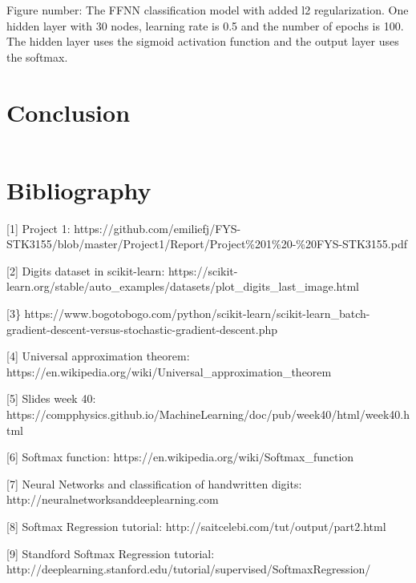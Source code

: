 \documentclass[11pt]{article}
\makeatletter
\newcommand{\boxspacing}{\kern\kvtcb@left@rule\kern\kvtcb@boxsep}
\newcommand{\prompt}[4]{
        {\ttfamily\llap{{\color{#2}[#3]:\hspace{3pt}#4}}\vspace{-\baselineskip}}
    }
\makeatother
\begin{document}
    Figure number: The FFNN classification model with added l2
regularization. One hidden layer with 30 nodes, learning rate is 0.5 and
the number of epochs is 100. The hidden layer uses the sigmoid
activation function and the output layer uses the softmax.

    \hypertarget{conclusion}{%
\section{Conclusion}\label{conclusion}}

    \begin{tcolorbox}[breakable, size=fbox, boxrule=1pt, pad at break*=1mm,colback=cellbackground, colframe=cellborder]
\prompt{In}{incolor}{ }{\boxspacing}
\begin{Verbatim}[commandchars=\\\{\}]

\end{Verbatim}
\end{tcolorbox}

    \hypertarget{bibliography}{%
\section{Bibliography}\label{bibliography}}

{[}1{]} Project 1:
https://github.com/emiliefj/FYS-STK3155/blob/master/Project1/Report/Project\%201\%20-\%20FYS-STK3155.pdf

{[}2{]} Digits dataset in scikit-learn:
https://scikit-learn.org/stable/auto\_examples/datasets/plot\_digits\_last\_image.html

{[}3\}
https://www.bogotobogo.com/python/scikit-learn/scikit-learn\_batch-gradient-descent-versus-stochastic-gradient-descent.php

{[}4{]} Universal approximation theorem:
https://en.wikipedia.org/wiki/Universal\_approximation\_theorem

{[}5{]} Slides week 40:
https://compphysics.github.io/MachineLearning/doc/pub/week40/html/week40.html

{[}6{]} Softmax function:
https://en.wikipedia.org/wiki/Softmax\_function

{[}7{]} Neural Networks and classification of handwritten digits:
http://neuralnetworksanddeeplearning.com

{[}8{]} Softmax Regression tutorial:
http://saitcelebi.com/tut/output/part2.html

{[}9{]} Standford Softmax Regression tutorial:
http://deeplearning.stanford.edu/tutorial/supervised/SoftmaxRegression/
    
    
    
\end{document}

